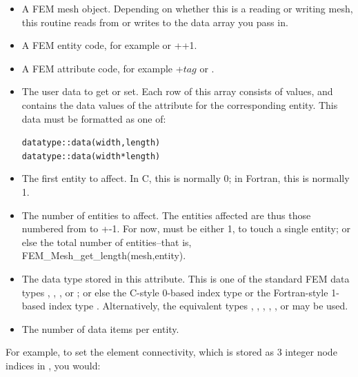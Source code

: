 \begin{itemize}
\item {} A FEM mesh object.  Depending on whether this is
   a reading or writing mesh, this routine reads from or writes to
   the data array you pass in.

\item {} A FEM entity code, for example  or
   ++1.

\item {} A FEM attribute code, for example +$tag$
   or .  
 
\item {} The user data to get or set.  Each row of this array consists
  of  values, and contains the data values of the attribute for the
  corresponding entity.  This data must be formatted as one of:
  \begin{alltt}
      datatype :: data(width,length)
      datatype :: data(width*length)
  \end{alltt}

\item {} The first entity to affect.  In C, this is normally 0;
  in Fortran, this is normally 1.

\item {} The number of entities to affect.  The entities
  affected are thus those numbered from  to +-1.
  For now,  must be either 1, to touch a single entity; or
  else the total number of entities--that is, FEM\_Mesh\_get\_length(mesh,entity).

\item {} The data type stored in this attribute.  This
  is one of the standard FEM data types , , 
  , or ; or else the C-style 0-based
  index type  or the Fortran-style 1-based index type
  . Alternatively, the equivalent types , ,
, , , or  may be used.

\item {} The number of data items per entity. 

\end{itemize}

For example, to set the element connectivity, which is stored as 
3 integer node indices in , you would:

